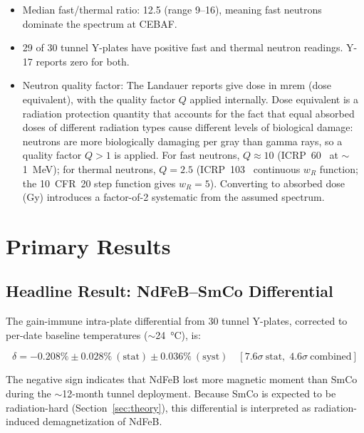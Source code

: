 \documentclass[11pt,letterpaper]{article}
\newcommand{\ndfeb}{NdFeB}
\newcommand{\smco}{SmCo}
\newcommand{\CEBAF}{CEBAF}
\begin{document}
\begin{itemize}
    \item Median fast/thermal ratio: 12.5 (range 9--16), meaning fast
    neutrons dominate the spectrum at \CEBAF.
    \item 29 of 30 tunnel Y-plates have positive fast and thermal
    neutron readings. Y-17 reports zero for both.
    \item Neutron quality factor: The Landauer reports give dose in
    mrem (dose equivalent), with the quality factor $Q$ applied internally.
    Dose equivalent is a radiation protection quantity that accounts for the
    fact that equal absorbed doses of different radiation types cause different
    levels of biological damage: neutrons are more biologically damaging per
    gray than gamma rays, so a quality factor $Q > 1$ is applied.
    For fast neutrons, $Q \approx 10$ (ICRP~60~\cite{ICRP60} at $\sim$\SI{1}{MeV}); for
    thermal neutrons, $Q = 2.5$ (ICRP~103~\cite{ICRP103} continuous $w_R$ function; the 10~CFR~20 step function gives $w_R = 5$). Converting to absorbed dose (Gy)
    introduces a factor-of-2 systematic from the assumed spectrum.
\end{itemize}

\section{Primary Results}
\label{sec:results}

\subsection{Headline Result: NdFeB--SmCo Differential}

The gain-immune intra-plate differential from 30 tunnel Y-plates, corrected
to per-date baseline temperatures ($\sim$\SI{24}{\celsius}), is:

\begin{equation}
\boxed{
    \delta = -0.208\% \pm 0.028\%~(\mathrm{stat}) \pm 0.036\%~(\mathrm{syst})
    \quad [7.6\sigma~\mathrm{stat},\; 4.6\sigma~\mathrm{combined}]
}
\label{eq:headline}
\end{equation}

The negative sign indicates that \ndfeb{} lost more magnetic moment than
\smco{} during the $\sim$12-month tunnel deployment. Because \smco{} is expected
to be radiation-hard (Section~\ref{sec:theory}), this differential is
interpreted as radiation-induced demagnetization of \ndfeb{}.
\end{document}
